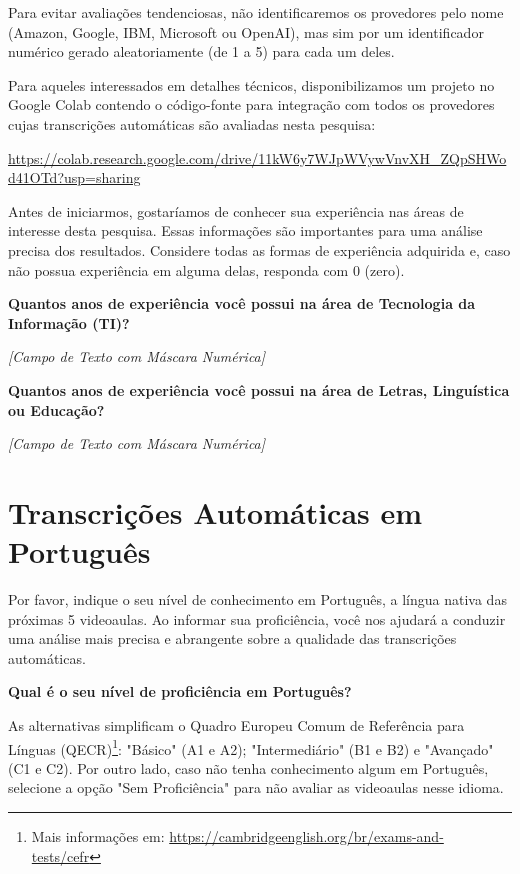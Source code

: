 \noindent
Para evitar avaliações tendenciosas, não identificaremos os provedores pelo nome 
(Amazon, Google, IBM, Microsoft ou OpenAI), mas sim por um identificador numérico 
gerado aleatoriamente (de 1 a 5) para cada um deles. 

\noindent
Para aqueles interessados em detalhes técnicos, disponibilizamos um projeto no Google Colab contendo o código-fonte para integração com todos os provedores cujas transcrições automáticas são avaliadas nesta pesquisa: 

\noindent
\url{https://colab.research.google.com/drive/11kW6y7WJpWVywVnvXH_ZQpSHWod41OTd?usp=sharing}

\noindent
Antes de iniciarmos, gostaríamos de conhecer sua experiência nas áreas de interesse 
desta pesquisa. Essas informações são importantes para uma análise precisa dos 
resultados. Considere todas as formas de experiência adquirida e, caso não possua 
experiência em alguma delas, responda com 0 (zero).

\noindent
\textbf{Quantos anos de experiência você possui na área de Tecnologia da Informação (TI)?}

\noindent
\textit{[Campo de Texto com Máscara Numérica]}

\noindent
\textbf{Quantos anos de experiência você possui na área de Letras, Linguística ou Educação?}

\noindent
\textit{[Campo de Texto com Máscara Numérica]}

\section{Transcrições Automáticas em Português}

\noindent
Por favor, indique o seu nível de conhecimento em Português, a língua nativa das 
próximas 5 videoaulas. Ao informar sua proficiência, você nos ajudará a conduzir uma 
análise mais precisa e abrangente sobre a qualidade das transcrições automáticas.

\noindent
\textbf{Qual é o seu nível de proficiência em Português?}

\noindent
As alternativas simplificam o Quadro Europeu Comum de Referência para Línguas (QECR)\footnote{Mais informações em: \url{https://cambridgeenglish.org/br/exams-and-tests/cefr}}: "Básico" (A1 e A2); "Intermediário" (B1 e B2) e "Avançado" (C1 e C2). Por outro lado, caso não tenha conhecimento algum em Português, selecione a opção "Sem Proficiência" para não avaliar as videoaulas nesse idioma.

